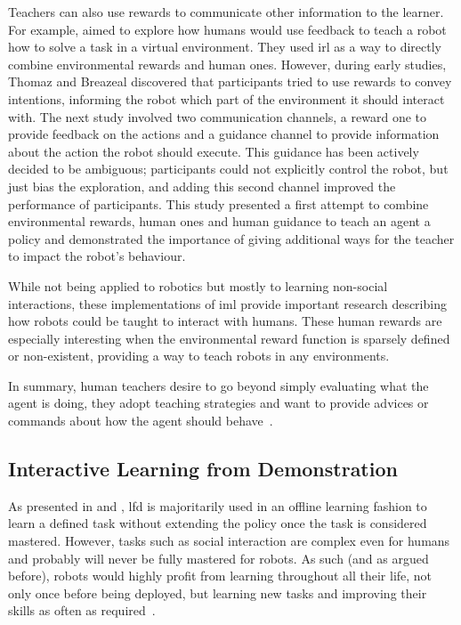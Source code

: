 Teachers can also use rewards to communicate other information to the learner. For example, \cite{thomaz2008teachable} aimed to explore how humans would use feedback to teach a robot how to solve a task in a virtual environment. They used \acrfull{irl} as a way to directly combine environmental rewards and human ones. However, during early studies, Thomaz and Breazeal discovered that participants tried to use rewards to convey intentions, informing the robot which part of the environment it should interact with. The next study involved two communication channels, a reward one to provide feedback on the actions and a guidance channel to provide information about the action the robot should execute. This guidance has been actively decided to be ambiguous; participants could not explicitly control the robot, but just bias the exploration, and adding this second channel improved the performance of participants. This study presented a first attempt to combine environmental rewards, human ones and human guidance to teach an agent a policy and demonstrated the importance of giving additional ways for the teacher to impact the robot's behaviour.

While not being applied to robotics but mostly to learning non-social interactions, these implementations of \gls{iml} provide important research describing how robots could be taught to interact with humans. These human rewards are especially interesting when the environmental reward function is sparsely defined or non-existent, providing a way to teach robots in any environments. 

In summary, human teachers desire to go beyond simply evaluating what the agent is doing, they adopt teaching strategies and want to provide advices or commands about how the agent should behave~\citep{amershi2014power}.

\subsection{Interactive Learning from Demonstration} \label{ssec:back_ilfd}

As presented in \cite{argall2009survey} and \cite{billard2008robot}, \gls{lfd} is majoritarily used in an offline learning fashion to learn a defined task without extending the policy once the task is considered mastered. However, tasks such as social interaction are complex even for humans and probably will never be fully mastered for robots. As such (and as argued before), robots would highly profit from learning throughout all their life, not only once before being deployed, but learning new tasks and improving their skills as often as required~\citep{dautenhahn2004robots}.

